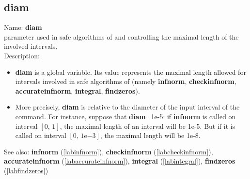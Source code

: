 \subsection{diam}
\label{labdiam}
\noindent Name: \textbf{diam}\\
parameter used in safe algorithms of \sollya and controlling the maximal length of the involved intervals.\\

\noindent Description: \begin{itemize}

\item \textbf{diam} is a global variable. Its value represents the maximal length allowed
   for intervals involved in safe algorithms of \sollya (namely \textbf{infnorm},
   \textbf{checkinfnorm}, \textbf{accurateinfnorm}, \textbf{integral}, \textbf{findzeros}).

\item More precisely, \textbf{diam} is relative to the diameter of the input interval of
   the command. For instance, suppose that \textbf{diam}=1e-5: if \textbf{infnorm} is called
   on interval $[0,\,1]$, the maximal length of an interval will be 1e-5. But if it
   is called on interval $[0,\,1\mathrm{e}{-3}]$, the maximal length will be 1e-8.
\end{itemize}
See also: \textbf{infnorm} (\ref{labinfnorm}), \textbf{checkinfnorm} (\ref{labcheckinfnorm}), \textbf{accurateinfnorm} (\ref{labaccurateinfnorm}), \textbf{integral} (\ref{labintegral}), \textbf{findzeros} (\ref{labfindzeros})
